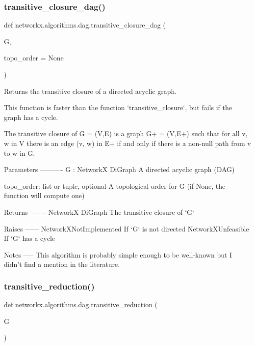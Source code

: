 \subsubsection{\texorpdfstring{transitive\+\_\+closure\+\_\+dag()}{transitive\_closure\_dag()}}
{\footnotesize\ttfamily def networkx.\+algorithms.\+dag.\+transitive\+\_\+closure\+\_\+dag (\begin{DoxyParamCaption}\item[{}]{G,  }\item[{}]{topo\+\_\+order = {\ttfamily None} }\end{DoxyParamCaption})}

\begin{DoxyVerb}Returns the transitive closure of a directed acyclic graph.

This function is faster than the function `transitive_closure`, but fails
if the graph has a cycle.

The transitive closure of G = (V,E) is a graph G+ = (V,E+) such that
for all v, w in V there is an edge (v, w) in E+ if and only if there
is a non-null path from v to w in G.

Parameters
----------
G : NetworkX DiGraph
    A directed acyclic graph (DAG)

topo_order: list or tuple, optional
    A topological order for G (if None, the function will compute one)

Returns
-------
NetworkX DiGraph
    The transitive closure of `G`

Raises
------
NetworkXNotImplemented
    If `G` is not directed
NetworkXUnfeasible
    If `G` has a cycle

Notes
-----
This algorithm is probably simple enough to be well-known but I didn't find
a mention in the literature.
\end{DoxyVerb}
 \mbox{\label{namespacenetworkx_1_1algorithms_1_1dag_ad4c177fd8eccf2503a153ddc6f73a8c2}} 
\subsubsection{\texorpdfstring{transitive\+\_\+reduction()}{transitive\_reduction()}}
{\footnotesize\ttfamily def networkx.\+algorithms.\+dag.\+transitive\+\_\+reduction (\begin{DoxyParamCaption}\item[{}]{G }\end{DoxyParamCaption})}

